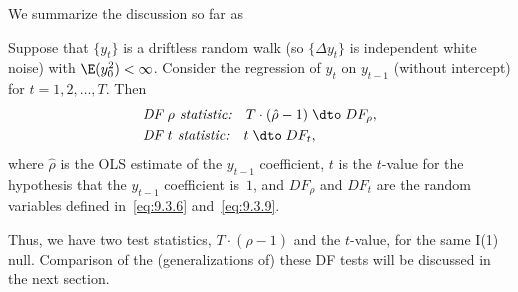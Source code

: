 We summarize the discussion so far as

\begin{proposition}
\label{prop:9.3}
Suppose that $\{y_t\}$ is a driftless random walk (so $\{\Delta y_t\}$ is independent white noise) with $\E(y_0^2) < \infty$. Consider the regression of $y_t$ on $y_{t-1}$
(without intercept) for $t = 1, 2, \ldots, T$. Then
\begin{align}
&\textit{DF $\rho$ statistic:}\quad T \cdot (\hat{\rho} - 1) \;\dto\; DF_\rho, \notag \\
&\textit{DF $t$ statistic:}\quad t \;\dto\; DF_t, \notag
\end{align}
where $\hat{\rho}$ is the OLS estimate of the $y_{t-1}$ coefficient, $t$ is the $t$-value for the hypothesis that the $y_{t-1}$ coefficient is~$1$, and $DF_\rho$ and $DF_t$ are the random variables defined
in~\eqref{eq:9.3.6} and~\eqref{eq:9.3.9}.
\end{proposition}

Thus, we have two test statistics, $T \cdot (\hat{\rho} - 1)$ and the $t$-value, for the same I(1) null.
Comparison of the (generalizations of) these DF tests will be discussed in the next
section.

